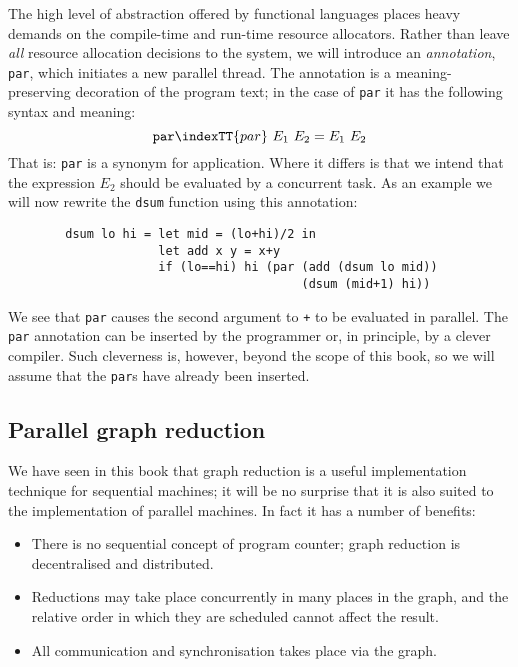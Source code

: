 The high level of abstraction offered by functional languages places
heavy demands on the compile-time and run-time resource allocators.
Rather than leave {\em all\/} resource allocation decisions to the
system, we will introduce an {\em annotation}, \mbox{\tt par}, which initiates a new parallel
thread. The annotation is a meaning-preserving decoration of the
program text; in the case of \mbox{\tt par} it has the following syntax and
meaning:
\[
  \mbox{\tt par}\indexTT{par}~E_1~E_2 = E_1~E_2
\]
That is: \mbox{\tt par} is a synonym for application. Where it differs is that
we intend that the expression $E_2$ should be evaluated by a
concurrent task. As an example we will now rewrite the \mbox{\tt dsum} function
using this annotation:
\begin{verbatim}
        dsum lo hi = let mid = (lo+hi)/2 in
                     let add x y = x+y
                     if (lo==hi) hi (par (add (dsum lo mid))
                                         (dsum (mid+1) hi))
\end{verbatim}

We see that \mbox{\tt par} causes the second argument to \mbox{\tt +} to be evaluated in
parallel. The \mbox{\tt par} annotation can be inserted by the programmer or,
in principle, by a clever compiler. Such cleverness is, however,
beyond the scope of this book, so we will assume that the \mbox{\tt par}s have
already been inserted.

\subsection{Parallel graph reduction}
\label{pgm:ss:paraGR}

We have seen in this book that graph reduction is a useful
implementation technique for sequential machines; it will be no
surprise that it is also suited to the implementation of parallel
machines. In fact it has a number of benefits:
\begin{itemize}

\item There is no sequential concept of program counter; graph reduction
is decentralised and distributed.

\item Reductions may take place concurrently in many places in the
graph, and the relative order in which they are scheduled cannot
affect the result.

\item All communication and synchronisation takes place via the
graph.
\end{itemize}

